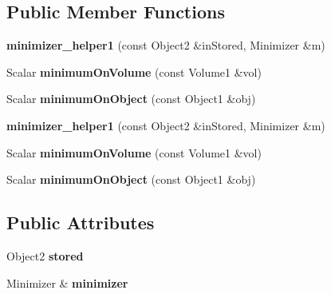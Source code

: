\subsection*{Public Member Functions}
\begin{DoxyCompactItemize}
\item 
\mbox{\label{struct_eigen_1_1internal_1_1minimizer__helper1_acea44319447f2b920c668411fb5827dd}} 
{\bfseries minimizer\+\_\+helper1} (const Object2 \&in\+Stored, Minimizer \&m)
\item 
\mbox{\label{struct_eigen_1_1internal_1_1minimizer__helper1_af25b0b90ed1d7a086c5ece41d2615c76}} 
Scalar {\bfseries minimum\+On\+Volume} (const Volume1 \&vol)
\item 
\mbox{\label{struct_eigen_1_1internal_1_1minimizer__helper1_abbf4ce046cb1b1919ac0988480bdfc89}} 
Scalar {\bfseries minimum\+On\+Object} (const Object1 \&obj)
\item 
\mbox{\label{struct_eigen_1_1internal_1_1minimizer__helper1_acea44319447f2b920c668411fb5827dd}} 
{\bfseries minimizer\+\_\+helper1} (const Object2 \&in\+Stored, Minimizer \&m)
\item 
\mbox{\label{struct_eigen_1_1internal_1_1minimizer__helper1_af25b0b90ed1d7a086c5ece41d2615c76}} 
Scalar {\bfseries minimum\+On\+Volume} (const Volume1 \&vol)
\item 
\mbox{\label{struct_eigen_1_1internal_1_1minimizer__helper1_abbf4ce046cb1b1919ac0988480bdfc89}} 
Scalar {\bfseries minimum\+On\+Object} (const Object1 \&obj)
\end{DoxyCompactItemize}
\subsection*{Public Attributes}
\begin{DoxyCompactItemize}
\item 
\mbox{\label{struct_eigen_1_1internal_1_1minimizer__helper1_afd1d01eb597bd3aaf6374824d25ed012}} 
Object2 {\bfseries stored}
\item 
\mbox{\label{struct_eigen_1_1internal_1_1minimizer__helper1_a60af736ccfde2112115a1bcc4c981db5}} 
Minimizer \& {\bfseries minimizer}
\end{DoxyCompactItemize}


